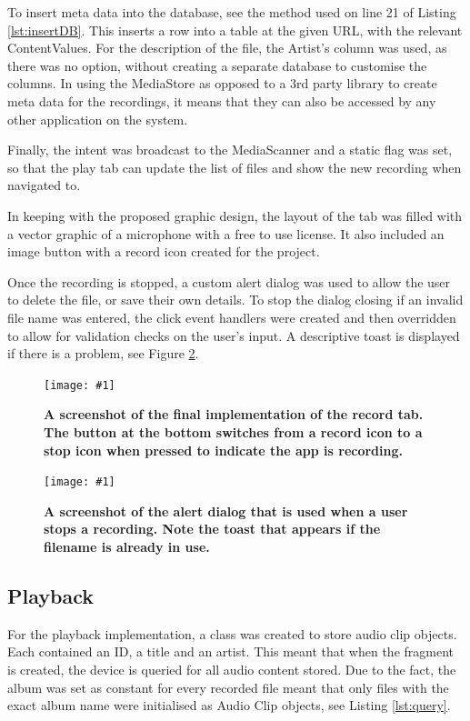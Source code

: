 \documentclass[conference]{acmsiggraph}
\newcommand{\figuremacroF}[3]{
	\begin{figure}[H] %
		\centering
		\texttt{[image: \#1]}
		\caption[#2]{\textbf{#2}}
		\label{fig:#1}
	\end{figure}
}
\begin{document}
To insert meta data into the database, see the method used on line 21 of Listing \ref{lst:insertDB}. This inserts a row into a table at the given URL, with the relevant ContentValues. For the description of the file, the Artist's column was used, as there was no option, without creating a separate database to customise the columns. In using the MediaStore as opposed to a 3rd party library to create meta data for the recordings, it means that they can also be accessed by any other application on the system.

Finally, the intent was broadcast to the MediaScanner and a static flag was set, so that the play tab can update the list of files and show the new recording when navigated to.

In keeping with the proposed graphic design, the layout of the tab was filled with a vector graphic of a microphone with a free to use license. \cite{microphone} It also included an image button with a record icon created for the project.

Once the recording is stopped, a custom alert dialog was used to allow the user to delete the file, or save their own details. To stop the dialog closing if an invalid file name was entered, the click event handlers were created and then overridden to allow for validation checks on the user's input. A descriptive toast is displayed if there is a problem, see Figure \ref{fig:dialog}.

\figuremacroF
{PlayTabSS}
{A screenshot of the final implementation of the record tab. The button at the bottom switches from a record icon to a stop icon when pressed to indicate the app is recording.}
{0.65}

\figuremacroF
{dialog}
{A screenshot of the alert dialog that is used when a user stops a recording. Note the toast that appears if the filename is already in use.}
{0.65}



\subsection{Playback}

For the playback implementation, a class was created to store audio clip objects. Each contained an ID, a title and an artist. This meant that when the fragment is created, the device is queried for all audio content stored. Due to the fact, the album was set as constant for every recorded file meant that only files with the exact album name were initialised as Audio Clip objects, see Listing \ref{lst:query}.
\end{document}
